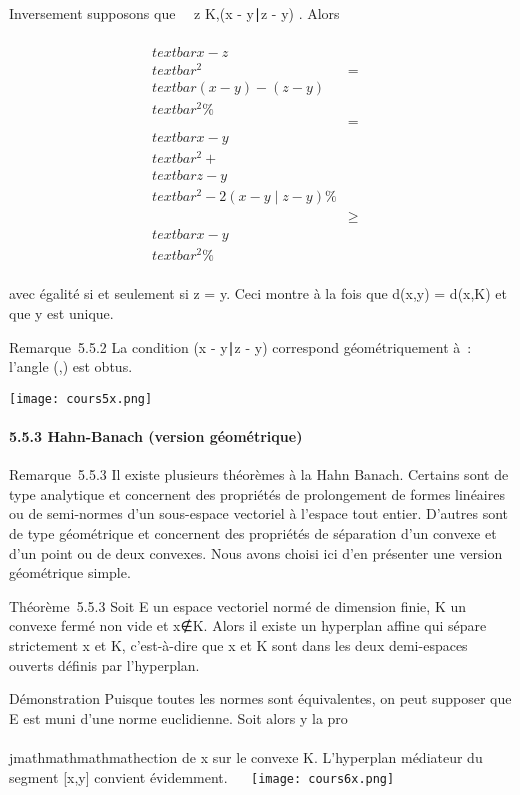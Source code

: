 Inversement supposons que \forall~~z \in
K,\quad (x - y∣z - y) .
Alors

\begin{align*} \\textbar{}x -
z\\textbar{}^2& =&
\\textbar{}(x - y) - (z -
y)\\textbar{}^2 \%&
\\ & =& \\textbar{}x -
y\\textbar{}^2 +\\textbar{} z -
y\\textbar{}^2 - 2(x -
y∣z - y)\%& \\
& ≥& \\textbar{}x -
y\\textbar{}^2 \%&
\\ \end{align*}

avec égalité si et seulement si z = y. Ceci montre à la fois que d(x,y)
= d(x,K) et que y est unique.

Remarque~5.5.2 La condition (x - y∣z - y) 
correspond géométriquement à~: l'angle
(\overrightarrowyx,\overrightarrowyz)
est obtus.

\texttt{[image: cours5x.png]}

\paragraph{5.5.3 Hahn-Banach (version géométrique)}

Remarque~5.5.3 Il existe plusieurs théorèmes à la Hahn Banach. Certains
sont de type analytique et concernent des propriétés de prolongement de
formes linéaires ou de semi-normes d'un sous-espace vectoriel à l'espace
tout entier. D'autres sont de type géométrique et concernent des
propriétés de séparation d'un convexe et d'un point ou de deux convexes.
Nous avons choisi ici d'en présenter une version géométrique simple.

Théorème~5.5.3 Soit E un espace vectoriel normé de dimension finie, K un
convexe fermé non vide et x∉K. Alors il
existe un hyperplan affine qui sépare strictement x et K, c'est-à-dire
que x et K sont dans les deux demi-espaces ouverts définis par
l'hyperplan.

Démonstration Puisque toutes les normes sont équivalentes, on peut
supposer que E est muni d'une norme euclidienne. Soit alors y la
pro\\\\jmathmathmathmathection de x sur le convexe K. L'hyperplan médiateur du segment
{[}x,y{]} convient évidemment. ~~ \texttt{[image: cours6x.png]}

